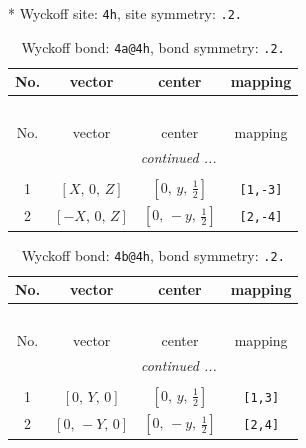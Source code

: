 \documentclass[fleqn,8pt]{jsarticle}
\begin{document}
* Wyckoff site: {\tt 4h}, site symmetry: {\tt .2.}
\renewcommand{\arraystretch}{1.2}
\begin{longtable}{cccc}
\caption{Wyckoff bond: {\tt 4a@4h}, bond symmetry: {\tt .2.}}
 \\
 \hline \hline
No. & vector & center & mapping \\ \hline \endfirsthead

\multicolumn{3}{l}{\tablename\ \thetable{}} \\
 \hline \hline
No. & vector & center & mapping \\ \hline \endhead

 \hline \hline
\multicolumn{3}{r}{\footnotesize\it continued ...} \\ \endfoot

 \hline \hline
\multicolumn{3}{r}{} \\ \endlastfoot

1 & $\left[ X,\, 0,\, Z \right]$ & $\left[ 0,\, y,\, \frac{1}{2} \right]$ & {\tt [1,-3]} \\ \hline
2 & $\left[ - X,\, 0,\, Z \right]$ & $\left[ 0,\, - y,\, \frac{1}{2} \right]$ & {\tt [2,-4]} \\
\end{longtable}
\renewcommand{\arraystretch}{1.2}
\begin{longtable}{cccc}
\caption{Wyckoff bond: {\tt 4b@4h}, bond symmetry: {\tt .2.}}
 \\
 \hline \hline
No. & vector & center & mapping \\ \hline \endfirsthead

\multicolumn{3}{l}{\tablename\ \thetable{}} \\
 \hline \hline
No. & vector & center & mapping \\ \hline \endhead

 \hline \hline
\multicolumn{3}{r}{\footnotesize\it continued ...} \\ \endfoot

 \hline \hline
\multicolumn{3}{r}{} \\ \endlastfoot

1 & $\left[ 0,\, Y,\, 0 \right]$ & $\left[ 0,\, y,\, \frac{1}{2} \right]$ & {\tt [1,3]} \\ \hline
2 & $\left[ 0,\, - Y,\, 0 \right]$ & $\left[ 0,\, - y,\, \frac{1}{2} \right]$ & {\tt [2,4]} \\
\end{longtable}
\renewcommand{\arraystretch}{1.2}
\end{document}
